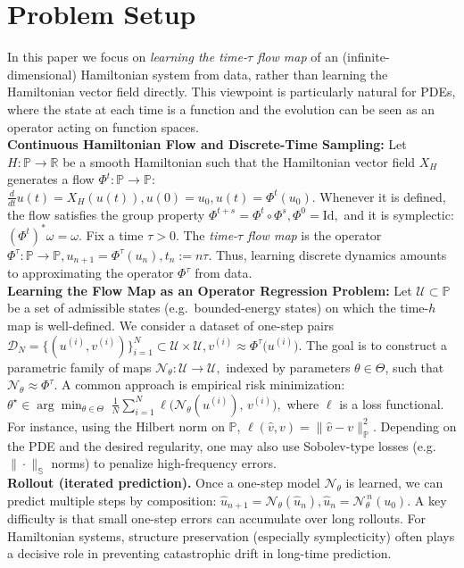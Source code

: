 \documentclass{article}
\theoremstyle{plain}
\theoremstyle{definition}
\theoremstyle{remark}
\newcommand{\bbS}{\mathbb{S}}
\newcommand{\bbP}{\mathbb{P}}
\begin{document}
\section{Problem Setup}
\label{sec:learn-discrete-flow}
In this paper we focus on \emph{learning the time-$\tau$ flow map} of an
(infinite-dimensional) Hamiltonian system from data, rather than learning the
Hamiltonian vector field directly.
This viewpoint is particularly natural for PDEs, where the state at each time
is a function and the evolution can be seen as an operator acting on function
spaces.\\
\textbf{Continuous Hamiltonian Flow and Discrete-Time Sampling:}
\label{subsec:flow-and-sampling}
Let $H:\bbP\to\mathbb{R}$ be a smooth Hamiltonian such that the Hamiltonian
vector field $X_H$ generates a flow $\Phi^t:\bbP\to\bbP$:
\(
\frac{d}{dt}u(t)=X_H(u(t)),u(0)=u_0, u(t)=\Phi^t(u_0).
\)
Whenever it is defined, the flow satisfies the group property
\(
\Phi^{t+s}=\Phi^t\circ\Phi^s, \Phi^0=\mathrm{Id},
\)
and it is symplectic:
\(
(\Phi^t)^*\omega=\omega.
\)
Fix a time $\tau>0$. The \emph{time-$\tau$ flow map} is
the operator
\(
\Phi^\tau:\bbP\to\bbP,
u_{n+1}=\Phi^\tau(u_n),
t_n:=n\tau.
\)
Thus, learning discrete dynamics amounts to approximating the operator $\Phi^\tau$
from data. \\
\textbf{Learning the Flow Map as an Operator Regression Problem:}
Let $\mathcal{U}\subset\bbP$ be a set of admissible states (e.g.\ bounded-energy
states) on which the time-$h$ map is well-defined.
We consider a dataset of one-step pairs
\(
\mathcal{D}_N=\big\{(u^{(i)},v^{(i)})\big\}_{i=1}^N
\subset \mathcal{U}\times\mathcal{U},
v^{(i)}\approx \Phi^\tau\big(u^{(i)}\big).
\)
The goal is to construct a parametric family of maps
\(
\mathcal{N}_\theta:\mathcal{U}\to\mathcal{U},
\)
indexed by parameters $\theta\in\Theta$, such that $\mathcal{N}_\theta\approx \Phi^\tau$.
A common approach is empirical risk minimization:
\(
\theta^\star \in \arg\min_{\theta\in\Theta}\;
\frac{1}{N}\sum_{i=1}^N
\ell\big(\mathcal{N}_\theta(u^{(i)}),\, v^{(i)}\big),
\)
where $\ell$ is a loss functional. For instance, using the Hilbert norm on $\bbP$,
\(
\ell(\hat v,v)=\|\hat v-v\|_{\bbP}^2.
\)
Depending on the PDE and the desired regularity, one may also use Sobolev-type
losses (e.g.\ $\|\cdot\|_{\bbS}$ norms) to penalize high-frequency errors.\\
\textbf{Rollout (iterated prediction).}
Once a one-step model $\mathcal{N}_\theta$ is learned, we can predict multiple
steps by composition:
\(
\hat u_{n+1}=\mathcal{N}_\theta(\hat u_n),
\hat u_n = \mathcal{N}_\theta^{\,n}(u_0).
\)
A key difficulty is that small one-step errors can accumulate over long rollouts.
For Hamiltonian systems, structure preservation (especially symplecticity) often
plays a decisive role in preventing catastrophic drift in long-time prediction.
\end{document}
